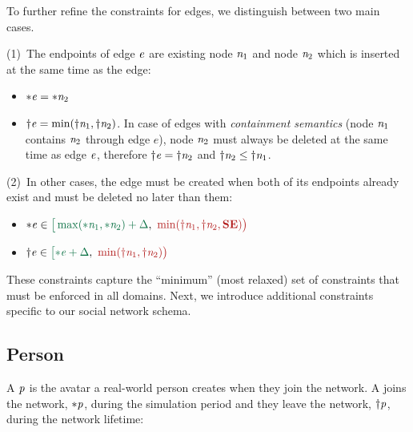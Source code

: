 To further refine the constraints for edges, we distinguish between two main cases.

(1)~The endpoints of edge $\mathit{e}$ are existing node $\mathit{n}_\mathrm{1}$ and node $\mathit{n}_\mathrm{2}$ which is inserted at the same time as the edge:
\begin{itemize}
    \item $ {\ast}\mathit{e} = {\ast}\mathit{\mathit{n}_\mathrm{2}} $ %
    \item $ {\dagger}\mathit{e} = \min({\dagger}\mathit{\mathit{n}_\mathrm{1}}, {\dagger}\mathit{\mathit{n}_\mathrm{2}}) $.
    In case of edges with \emph{containment semantics} (node $\mathit{n}_\mathrm{1}$ contains $\mathit{n}_\mathrm{2}$ through edge $e$),
    node $\mathit{n}_\mathrm{2}$ must always be deleted at the same time as edge $\mathit{e}$,
    therefore
    ${\dagger}\mathit{e} = {\dagger}\mathit{\mathit{n}_\mathrm{2}}$ and ${\dagger}\mathit{\mathit{n}_\mathrm{2}} \leq {\dagger}\mathit{\mathit{n}_\mathrm{1}}$.
\end{itemize}

(2)~In other cases, the edge must be created when both of its endpoints already exist and must be deleted no later than them:

\begin{itemize}
    \item $ \varc{e} \in \interval
        {\max(\varcn{1}, \varcn{2}) + \Delta}
        {\min(\vardn{1}, \vardn{2}, \xSE)} $
    \item $ \vard{e} \in \interval
        {\varc{e} + \Delta}
        {\min(\vardn{1}, \vardn{2})} $
\end{itemize}

These constraints capture the ``minimum'' (\ie most relaxed) set of constraints that must be enforced in all domains.
Next, we introduce additional constraints specific to our social network schema.

\subsection{Person}

A \tPerson $\mathit{p}$ is the avatar a real-world person creates when they join the network. A \tPerson joins the network, ${\ast}\mathit{\mathit{p}}$, during the simulation period and they leave the network, ${\dagger}\mathit{\mathit{p}}$, during the network lifetime:

